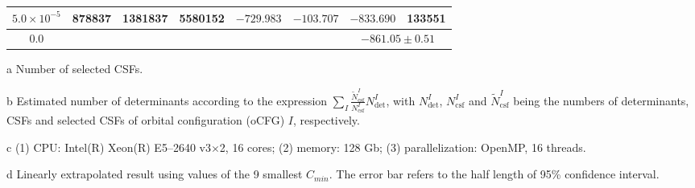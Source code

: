 \documentclass[journal=jcp,manuscript=suppinfo]{achemso}
\begin{document}
\begin{table}[!htp]
\begin{threeparttable}
\begin{tabular}{c|rrrrrrr}
			$5.0\times10^{-5}$ &   878837 &  1381837 &5580152&  $-729.983$  &  $-103.707$&  $-833.690$ &133551\\\midrule
			0.0\tnote{b}&&&&&&\multicolumn{2}{c}{$-861.05\pm0.51$}\\\bottomrule
		\end{tabular}
\begin{tablenotes}
\item[a]Number of selected CSFs.
\item[b]Estimated number of determinants according to the expression $\sum_I\frac{\tilde{N}_{\mathrm{csf}}^I}{N_{\mathrm{csf}}^I}N_{\mathrm{det}}^I$, with $N_{\mathrm{det}}^I$, $N_{\mathrm{csf}}^I$ and $\tilde{N}_{\mathrm{csf}}^I$ being the numbers of determinants, CSFs and selected CSFs of orbital configuration (oCFG) $I$, respectively.
\item[c](1) CPU: Intel(R) Xeon(R) E5--2640 v3$\times$2, 16 cores; (2) memory: 128 Gb;
			(3) parallelization: OpenMP, 16 threads.
\item[d]Linearly extrapolated result using values of the 9 smallest $C_{min}$. The error bar refers to the half length of 95\% confidence interval.
		\end{tablenotes}
	\end{threeparttable}
	\label{OldNO}
\end{table}
\end{document}
